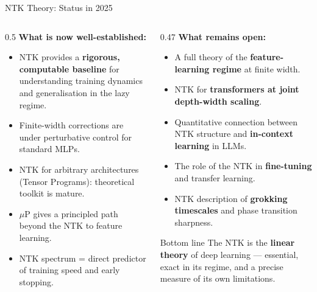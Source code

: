 \documentclass[aspectratio=169, 10pt]{beamer}
\newcommand{\highlight}[1]{\textcolor{blue!70!black}{\textbf{#1}}}
\newcommand{\myalert}[1]{\textcolor{red!70!black}{\textbf{#1}}}
\begin{document}
\begin{frame}{NTK Theory: Status in 2025}
  \begin{columns}[T]
    \begin{column}{0.5\textwidth}
      \textbf{What is now well-established:}
      \begin{itemize}
        \item NTK provides a \highlight{rigorous, computable baseline} for understanding training dynamics and generalisation in the lazy regime.
        \item Finite-width corrections are under perturbative control for standard MLPs.
        \item NTK for arbitrary architectures (Tensor Programs): theoretical toolkit is mature.
        \item $\mu$P gives a principled path beyond the NTK to feature learning.
        \item NTK spectrum = direct predictor of training speed and early stopping.
      \end{itemize}
    \end{column}
    \begin{column}{0.47\textwidth}
      \textbf{What remains open:}
      \begin{itemize}
        \item A full theory of the \myalert{feature-learning regime} at finite width.
        \item NTK for \myalert{transformers at joint depth-width scaling}.
        \item Quantitative connection between NTK structure and \myalert{in-context learning} in LLMs.
        \item The role of the NTK in \myalert{fine-tuning} and transfer learning.
        \item NTK description of \myalert{grokking timescales} and phase transition sharpness.
      \end{itemize}

      \begin{block}{\small Bottom line}
        The NTK is the \textbf{linear theory} of deep learning — essential, exact in its regime, and a precise measure of its own limitations.
      \end{block}
    \end{column}
  \end{columns}
\end{frame}
\end{document}
